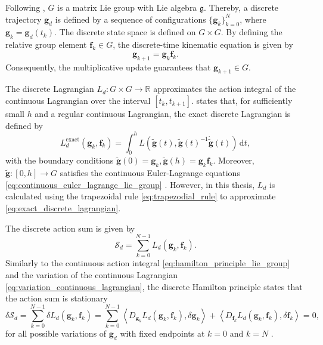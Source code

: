 Following \cite{Lee2008,Marsden2001}, $G$ is a matrix Lie group with Lie algebra $\mathfrak g$. 
Thereby, a discrete trajectory $\bm{g}_d$ is defined by a sequence of configurations 
$\{\bm{g}_k\}_{k=0}^{N}$, where $\bm{g}_k = \bm{g}_d(t_k)$. The discrete state space is defined on $G \times G$.
By defining the relative group element $\bm{f}_k\in G$, the discrete-time kinematic equation is given by
\begin{equation}
    \bm{g}_{k+1}=\bm{g}_k\bm{f}_k.
    \label{eq:discrete_lie_group_kinematics}
\end{equation}
Consequently, the multiplicative update guarantees that $\bm{g}_{k+1}\in G$.

The discrete Lagrangian $L_d:G\times G\rightarrow\mathbb R$
approximates the action integral of the continuous Lagrangian over the interval $[t_k,t_{k+1}]$.
\cite{Marsden2001} states that, for sufficiently small $h$ and a regular continuous Lagrangian, the exact discrete Lagrangian is defined by
\begin{equation}
    L_d^{\mathrm{exact}}(\bm{g}_k,\bm{f}_k)
    =
    \int_0^h
    L\!\left(\widetilde{\bm{g}}(t),
    \widetilde{\bm{g}}(t)^{-1}\dot{\widetilde{\bm{g}}}(t)\right)
    \,\mathrm dt,
    \label{eq:exact_discrete_lagrangian}
\end{equation}
with the boundary conditions $\widetilde{\bm{g}}(0)=\bm{g}_k, \widetilde{\bm{g}}(h)=\bm{g}_k\bm{f}_k$.
Moreover, $\widetilde{\bm{g}}:[0,h]\rightarrow G$ satisfies the continuous Euler-Lagrange 
equations \eqref{eq:continuous_euler_lagrange_lie_group} \cite{Lee2008}. 
However, in this thesis, $L_d$ is calculated using the trapezoidal rule \eqref{eq:trapezodial_rule} 
to approximate \eqref{eq:exact_discrete_lagrangian}.

The discrete action sum is given by
\begin{equation}
    \mathcal S_d
    =
    \sum_{k=0}^{N-1}L_d(\bm{g}_k,\bm{f}_k).
    \label{eq:discrete_action_sum}
\end{equation}
Similarly to the continuous action integral \eqref{eq:hamilton_principle_lie_group} and the variation of the continuous Lagrangian \eqref{eq:variation_continuous_lagrangian}, 
the discrete Hamilton principle states that the action sum is stationary
\begin{equation}
    \delta\mathcal S_d
    =
    \sum_{k=0}^{N-1}\delta L_d(\bm{g}_k,\bm{f}_k)
    = \sum_{k=0}^{N-1} \left\langle D_{\bm{g}_k}L_d(\bm{g}_k,\bm{f}_k),\delta\bm{g}_k\right\rangle
    +
    \left\langle D_{\bm{f}_k}L_d(\bm{g}_k,\bm{f}_k),\delta\bm{f}_k\right\rangle
    =0,
    \label{eq:discrete_hamilton_principle}
\end{equation}
for all possible variations of $\bm{g}_d$ with fixed endpoints at $k=0$ and $k=N$ \cite{Marsden2001}.

